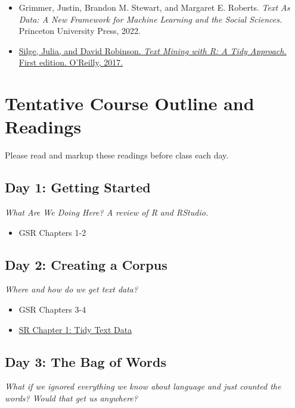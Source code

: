 \documentclass[11pt, letterpaper]{article}
\begin{document}
\begin{itemize}
\item Grimmer, Justin, Brandon M. Stewart, and Margaret E. Roberts. \textit{Text As Data: A New Framework for Machine Learning and the Social Sciences.} Princeton University Press, 2022.
\item \href{https://www.tidytextmining.com/index.html}{Silge, Julia, and David Robinson. \textit{Text Mining with R: A Tidy Approach.} First edition. O’Reilly, 2017.}
\end{itemize}



\section*{Tentative Course Outline and Readings}

Please read and markup these readings before class each day.

\subsection*{Day 1: Getting Started}

\textit{What Are We Doing Here? A review of R and RStudio.}

\begin{itemize}
	\item GSR Chapters 1-2
\end{itemize}

\subsection*{Day 2: Creating a Corpus}

\textit{Where and how do we get text data?}

\begin{itemize}
	\item GSR Chapters 3-4
	\item \href{https://www.tidytextmining.com/tidytext.html}{SR Chapter 1: Tidy Text Data}
\end{itemize}

\subsection*{Day 3: The Bag of Words}

\textit{What if we ignored everything we know about language and just counted the words? Would that get us anywhere?}
\end{document}
